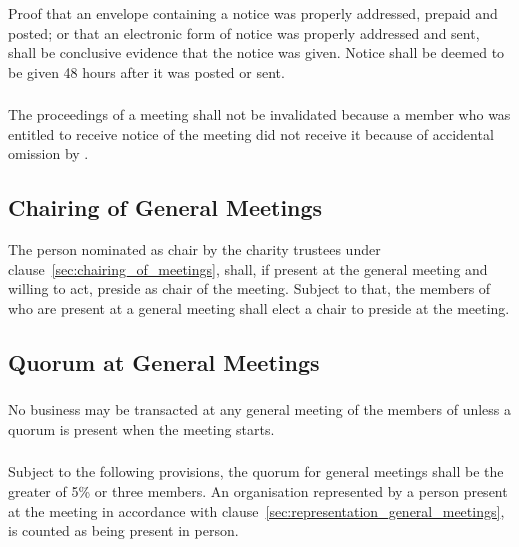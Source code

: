         \subsubsection{}
        Proof that an envelope containing a notice was properly addressed, prepaid and posted; or that an electronic form of notice was properly addressed and sent, shall be conclusive evidence that the notice was given. Notice shall be deemed to be given 48 hours after it was posted or sent.

        \subsubsection{}
        The proceedings of a meeting shall not be invalidated because a member who was entitled to receive notice of the meeting did not receive it because of accidental omission by \shortname{}.

    \subsection{Chairing of General Meetings}\label{sec:chairing_general_meetings}
    The person nominated as chair by the charity trustees under clause~\ref{sec:chairing_of_meetings}, shall, if present at the general meeting and willing to act, preside as chair of the meeting. Subject to that, the members of \shortname{} who are present at a general meeting shall elect a chair to preside at the meeting.

    \subsection{Quorum at General Meetings}\label{sec:quorum_general_meetings}

        \subsubsection{}
        No business may be transacted at any general meeting of the members of \shortname{} unless a quorum is present when the meeting starts.

        \subsubsection{}
        Subject to the following provisions, the quorum for general meetings shall be the greater of 5\% or three members. An organisation represented by a person present at the meeting in accordance with clause~\ref{sec:representation_general_meetings}, is counted as being present in person.

